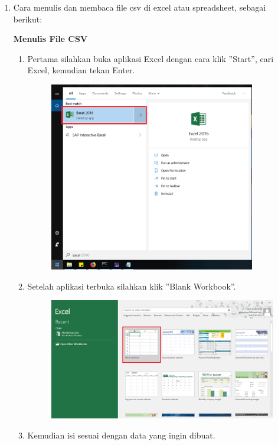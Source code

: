 \begin{enumerate}
	\item Cara menulis dan membaca file csv di excel atau spreadsheet, sebagai berikut:
	
	\textbf{Menulis File CSV}
	
	\begin{enumerate}
		\item Pertama silahkan buka aplikasi Excel dengan cara klik ''Start'', cari Excel, kemudian tekan Enter.
		
		\begin{figure}[H]
			\includegraphics[width=9cm]{figures/felix/Chapter4/t1.png}
			\centering
		\end{figure}
		
		\item Setelah aplikasi terbuka silahkan klik ''Blank Workbook''.
		
		\begin{figure}[H]
			\includegraphics[width=10cm]{figures/felix/Chapter4/t2.png}
			\centering
		\end{figure}
		
		\item Kemudian isi sesuai dengan data yang ingin dibuat.
		

\end{enumerate}
\end{enumerate}
